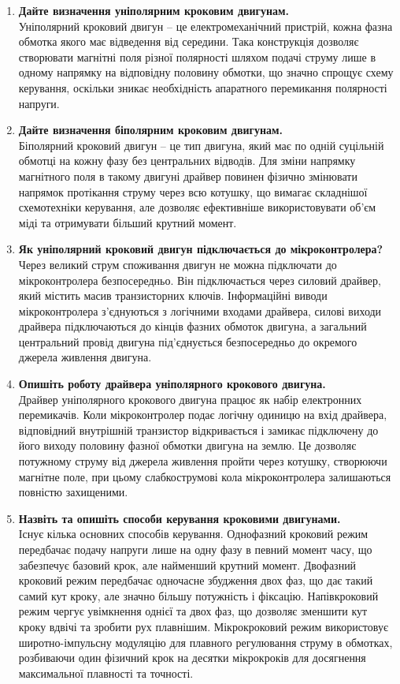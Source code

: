 \documentclass[14pt, a4paper]{extreport}
\begin{document}
	\begin{enumerate}
		\item \textbf{Дайте визначення уніполярним кроковим двигунам.} \\ Уніполярний кроковий двигун -- це електромеханічний пристрій, кожна фазна обмотка якого має відведення від середини. Така конструкція дозволяє створювати магнітні поля різної полярності шляхом подачі струму лише в одному напрямку на відповідну половину обмотки, що значно спрощує схему керування, оскільки зникає необхідність апаратного перемикання полярності напруги.
		
		\item \textbf{Дайте визначення біполярним кроковим двигунам.} \\ Біполярний кроковий двигун -- це тип двигуна, який має по одній суцільній обмотці на кожну фазу без центральних відводів. Для зміни напрямку магнітного поля в такому двигуні драйвер повинен фізично змінювати напрямок протікання струму через всю котушку, що вимагає складнішої схемотехніки керування, але дозволяє ефективніше використовувати об'єм міді та отримувати більший крутний момент.
		
		\item \textbf{Як уніполярний кроковий двигун підключається до мікроконтролера?} \\ Через великий струм споживання двигун не можна підключати до мікроконтролера безпосередньо. Він підключається через силовий драйвер, який містить масив транзисторних ключів. Інформаційні виводи мікроконтролера з'єднуються з логічними входами драйвера, силові виходи драйвера підключаються до кінців фазних обмоток двигуна, а загальний центральний провід двигуна під'єднується безпосередньо до окремого джерела живлення двигуна.
		
		\item \textbf{Опишіть роботу драйвера уніполярного крокового двигуна.} \\ Драйвер уніполярного крокового двигуна працює як набір електронних перемикачів. Коли мікроконтролер подає логічну одиницю на вхід драйвера, відповідний внутрішній транзистор відкривається і замикає підключену до його виходу половину фазної обмотки двигуна на землю. Це дозволяє потужному струму від джерела живлення пройти через котушку, створюючи магнітне поле, при цьому слабкострумові кола мікроконтролера залишаються повністю захищеними.
		
		\item \textbf{Назвіть та опишіть способи керування кроковими двигунами.} \\ Існує кілька основних способів керування. Однофазний кроковий режим передбачає подачу напруги лише на одну фазу в певний момент часу, що забезпечує базовий крок, але найменший крутний момент. Двофазний кроковий режим передбачає одночасне збудження двох фаз, що дає такий самий кут кроку, але значно більшу потужність і фіксацію. Напівкроковий режим чергує увімкнення однієї та двох фаз, що дозволяє зменшити кут кроку вдвічі та зробити рух плавнішим. Мікрокроковий режим використовує широтно-імпульсну модуляцію для плавного регулювання струму в обмотках, розбиваючи один фізичний крок на десятки мікрокроків для досягнення максимальної плавності та точності.
		

\end{enumerate}
\end{document}
